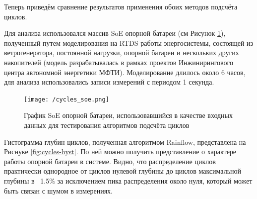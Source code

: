 \documentclass{report}
\begin{document}
\begin{enumerate}
\begin{algorithm}
\begin{algorithmic}[1]
 
\EndFunction
\Statex

     
    \EndWhile
\EndIf
{}
    \EndWhile
    
\EndIf
{}
\EndWhile
 
\end{algorithmic}
\end{algorithm}

\end{enumerate}

Теперь приведём сравнение результатов применения обоих методов подсчёта циклов.

Для анализа использовался массив SoE опорной батареи (см Рисунок \ref{fig:core-cycles-line}), полученный путем моделирования на RTDS работы энергосистемы, состоящей из ветрогенератора, постоянной нагрузки, опорной батареи и нескольких других накопителей (модель разрабатывалась в рамках проектов Инжинирингового центра автономной энергетики МФТИ).
Моделирование длилось около 6 часов, для анализа использовались записи измерений с периодом 1 секунда.

\begin{figure}[h]
\texttt{[image: /cycles\_soe.png]}
\caption{График SoE опорной батареи, использовавшийся в качестве входных данных для тестирования алгоритмов подсчёта циклов}
\centering
\label{fig:core-cycles-line}
\end{figure}

\medskip

Гистограмма глубин циклов, полученная алгоритмом Rainflow, представлена на Риснуке \ref{fig:cycles-hyst}.
По ней можно получить представление о характере работы опорной батареи в системе.
Видно, что распределение циклов практически однородное от циклов нулевой глубины до циклов максимальной глубины в ~1.5\% за исключением пика распределения около нуля, который может быть связан с шумом в измерениях.
\end{document}
